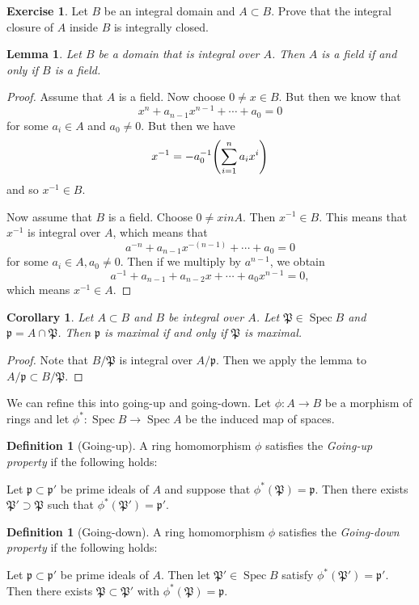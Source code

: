 \documentclass[leqno, openany]{memoir}
\newtheorem{cor}[thm]{Corollary}
\newtheorem{lem}[thm]{Lemma}
\theoremstyle{definition}
\newtheorem{defn}[thm]{Definition}
\newtheorem{exer}[thm]{Exercise}
\theoremstyle{remark}
\theoremstyle{plain}
\theoremstyle{definition}
\theoremstyle{remark}
\newcommand{\mf}[1]{\mathfrak{#1}}
\DeclareMathOperator{\Spec}{Spec}
\begin{document}
\begin{exer} Let $B$ be an integral domain and $A \subset B$. Prove that the
integral closure of $A$ inside $B$ is integrally closed.  \end{exer}

\begin{lem} Let $B$ be a domain that is integral over $A$. Then $A$ is a field
if and only if $B$ is a field.  \end{lem}

\begin{proof} Assume that $A$ is a field. Now choose $0 \neq x \in B$. But then
    we know that \[ x^n + a_{n-1}x^{n-1} + \cdots + a_0 = 0 \] for some $a_i
    \in A$ and $a_0 \neq 0$. But then we have \[ x^{-1} = -a_0^{-1} \qty(
    \sum_{i=1}^n a_i x^i ) \] and so $x^{-1} \in B$.

    Now assume that $B$ is a field. Choose $0 \neq x in A$. Then $x^{-1} \in
    B$. This means that $x^{-1}$ is integral over $A$, which means that \[
    a^{-n} + a_{n-1} x^{-(n-1)} + \cdots + a_0 = 0 \] for some $a_i \in A, a_0
    \neq 0$. Then if we multiply by $a^{n-1}$, we obtain \[ a^{-1} + a_{n-1} +
    a_{n-2} x + \cdots + a_0 x^{n-1} = 0, \] which means $x^{-1} \in A$.
\end{proof}

\begin{cor} Let $A \subset B$ and $B$ be integral over $A$. Let $\mf{P} \in
\Spec B$ and $\mf{p} = A \cap \mf{P}$. Then $\mf{p}$ is maximal if and only if
$\mf{P}$ is maximal.  \end{cor}

\begin{proof} Note that $B/ \mf{P}$ is integral over $A / \mf{p}$. Then we
apply the lemma to $A / \mf{p} \subset B / \mf{P}$.  \end{proof}

We can refine this into going-up and going-down. Let $\phi: A \to B$ be a
morphism of rings and let $\phi^*: \Spec B \to \Spec A$ be the induced map of
spaces.

\begin{defn}[Going-up] A ring homomorphism $\phi$ satisfies the
    \textit{Going-up property} if the following holds:

    Let $\mf{p} \subset \mf{p}'$ be prime ideals of $A$ and suppose that
$\phi^*(\mf{P}) = \mf{p}$. Then there exists $\mf{P}' \supset \mf{P}$ such that
$\phi^*(\mf{P}') = \mf{p}'$.  \end{defn}

\begin{defn}[Going-down] A ring homomorphism $\phi$ satisfies the
    \textit{Going-down property} if the following holds:

    Let $\mf{p} \subset \mf{p}'$ be prime ideals of $A$. Then let $\mf{P}' \in
\Spec B$ satisfy $\phi^*(\mf{P}') = \mf{p}'$. Then there exists $\mf{P} \subset
\mf{P}'$ with $\phi^*(\mf{P}) = \mf{p}$.  \end{defn}
\end{document}
